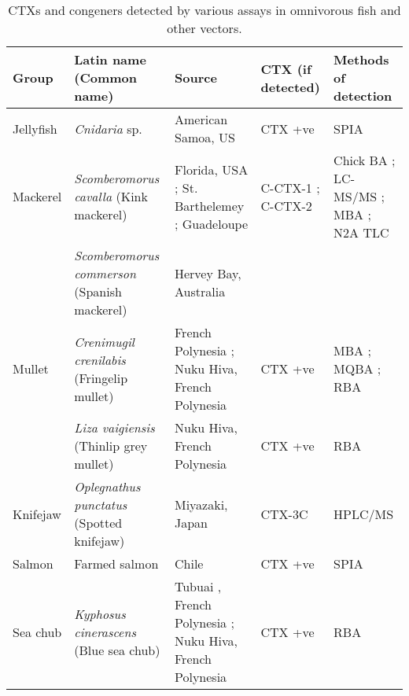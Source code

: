 \documentclass[12pt]{article}
\begin{document}
\FloatBarrier
\begin{table}
\caption{CTXs and congeners detected by various assays in omnivorous fish and other vectors.}
\label{tbl:OmniTable}
\begin{tabular}{ | p{2cm} | p{3cm} | p{4.5cm} | p{2cm} | p{3cm} | }
\hline
\textbf{Group} & \textbf{Latin name} (Common name) & \textbf{Source} & \textbf{CTX (if detected)} & \textbf{Methods of detection} \\
\hline 
 Jellyfish &  \emph{Cnidaria} sp. &  American Samoa, US \cite{zlotnick1995ciguatera} & CTX +ve \cite{zlotnick1995ciguatera} &  SPIA \cite{zlotnick1995ciguatera} \\
 \hline
 Mackerel & \emph{Scomberomorus cavalla} (Kink mackerel) & Florida, USA \cite{dickey2008ciguatera}; St. Barthelemey \cite{pottier2001ciguatera,vernoux1986heterogeneity};  Guadeloupe \cite{pottier2001ciguatera} & C-CTX-1 \cite{dickey2008ciguatera}; C-CTX-2 \cite{dickey2008ciguatera} & Chick BA \cite{pottier2001ciguatera}; LC-MS/MS \cite{dickey2008ciguatera}; MBA \cite{vernoux1986heterogeneity}; N2A \cite{dickey2008ciguatera} TLC \cite{vernoux1986heterogeneity} \\
  & \emph{Scomberomorus commerson} (Spanish mackerel) & Hervey Bay, Australia \cite{} &  & \\ %
 \hline
Mullet  &  \emph{Crenimugil crenilabis} (Fringelip mullet) & French Polynesia \cite{bagnis1987use}; Nuku Hiva, French Polynesia \cite{darius2007ciguatera} & CTX +ve \cite{darius2007ciguatera} & MBA \cite{bagnis1987use}; MQBA \cite{bagnis1987use}; RBA \cite{darius2007ciguatera}\\
  & \emph{Liza vaigiensis} (Thinlip grey mullet) & Nuku Hiva, French Polynesia \cite{darius2007ciguatera} & CTX +ve \cite{darius2007ciguatera} & RBA \cite{darius2007ciguatera} \\
  \hline
 Knifejaw & \emph{Oplegnathus punctatus} (Spotted knifejaw) & Miyazaki, Japan \cite{yogi2011detailed} & CTX-3C \cite{yogi2011detailed} & HPLC/MS \cite{yogi2011detailed}\\
 \hline
 Salmon &  Farmed salmon & Chile \cite{ebesu1994first} & CTX +ve \cite{ebesu1994first} & SPIA \cite{ebesu1994first}\\
 \hline
 Sea chub & \emph{Kyphosus cinerascens} (Blue sea chub)  & Tubuai , French Polynesia \cite{darius2007ciguatera}; Nuku Hiva, French Polynesia \cite{darius2007ciguatera} & CTX +ve \cite{darius2007ciguatera} & RBA \cite{darius2007ciguatera}  \\
 \hline

\end{tabular}
\end{table}
\end{document}

